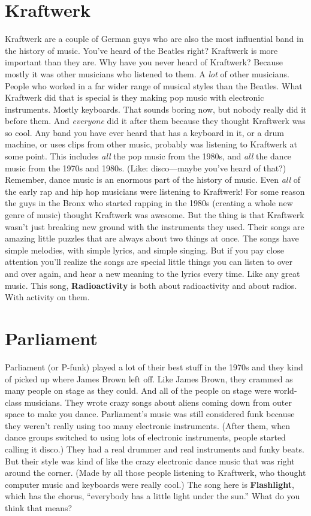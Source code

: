 \documentclass[letterpaper,single]{article}
\begin{document}
\section{Kraftwerk}
Kraftwerk are a couple of German guys who are also the most influential band in the history of music. 
You've heard of the Beatles right? 
Kraftwerk is more important than they are. 
Why have you never heard of Kraftwerk? 
Because mostly it was other musicians who listened to them. 
A \emph{lot} of other musicians. 
People who worked in a far wider range of musical styles than the Beatles. 
What Kraftwerk did that is special is they making pop music with electronic instruments. 
Mostly keyboards. 
That sounds boring now, but nobody really did it before them. 
And \emph{everyone} did it after them because they thought Kraftwerk was so cool. 
Any band you have ever heard that has a keyboard in it, or a drum machine, or uses clips from other music, probably was listening to Kraftwerk at some point. 
This includes \emph{all} the pop music from the 1980s, and \emph{all} the dance music from the 1970s and 1980s. (Like: disco---maybe you've heard of that?)
Remember, dance music is an enormous part of the history of music.
Even \emph{all} of the early rap and hip hop musicians were listening to Kraftwerk! 
For some reason the guys in the Bronx who started rapping in the 1980s (creating a whole new genre of music) thought Kraftwerk was awesome. 
But the thing is that Kraftwerk wasn't just breaking new ground with the instruments they used. 
Their songs are amazing little puzzles that are always about two things at once. 
The songs have simple melodies, with simple lyrics, and simple singing. 
But if you pay close attention you'll realize the songs are special little things you can listen to over and over again, and hear a new meaning to the lyrics every time. 
Like any great music. 
This song, \textbf{Radioactivity} is both about radioactivity and about radios. With activity on them.

\section{Parliament}
Parliament (or P-funk) played a lot of their best stuff in the 1970s and they kind of picked up where James Brown left off. 
Like James Brown, they crammed as many people on stage as they could. 
And all of the people on stage were world-class musicians. 
They wrote crazy songs about aliens coming down from outer space to make you dance. 
Parliament's music was still considered funk because they weren't really using too many electronic instruments. 
(After them, when dance groups switched to using lots of electronic instruments, people started calling it disco.) 
They had a real drummer and real instruments and funky beats.
But their style was kind of like the crazy electronic dance music that was right around the corner. 
(Made by all those people listening to Kraftwerk, who thought computer music and keyboards were really cool.)
The song here is \textbf{Flashlight}, which has the chorus, ``everybody has a little light under the sun.'' 
What do you think that means?
\end{document}
